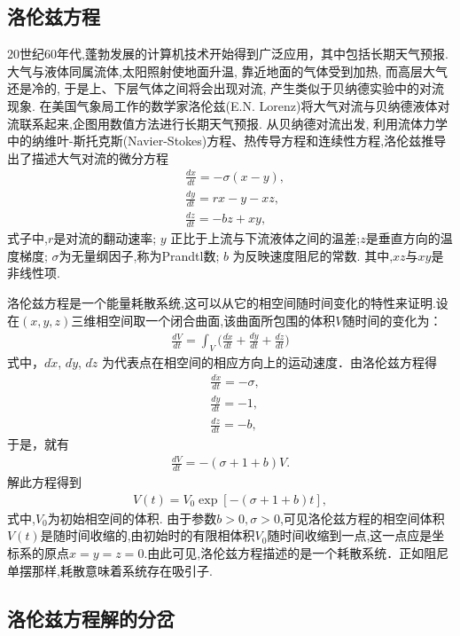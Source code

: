 \subsection{洛伦兹方程}

20世纪60年代,蓬勃发展的计算机技术开始得到广泛应用，其中包括长期天气预报. 大气与液体同属流体,太阳照射使地面升温, 靠近地面的气体受到加热, 而高层大气还是冷的, 于是上、下层气体之间将会出现对流, 产生类似于贝纳德实验中的对流现象. 在美国气象局工作的数学家洛伦兹(E.N. Lorenz)将大气对流与贝纳德液体对流联系起来,企图用数值方法进行长期天气预报. 从贝纳德对流出发, 利用流体力学中的纳维叶-斯托克斯(Navier-Stokes)方程、热传导方程和连续性方程,洛伦兹推导出了描述大气对流的微分方程
\begin{align}
&\frac{dx}{dt}=-\sigma (x-y),\\
&\frac{dy}{dt}=rx-y-xz,\\
&\frac{dz}{dt}=-bz+xy,
\end{align}
式子中,$r$是对流的翻动速率; $y$ 正比于上流与下流液体之间的温差;$z$是垂直方向的温度梯度; $\sigma$为无量纲因子,称为Prandtl数; $b$ 为反映速度阻尼的常数. 其中,$xz$与$xy$是非线性项.

洛伦兹方程是一个能量耗散系统,这可以从它的相空间随时间变化的特性来证明.设在$(x,y, z)$三维相空间取一个闭合曲面,该曲面所包围的体积$V$随时间的变化为：
\begin{align}
\frac{dV}{dt}=\int_V \Big(\frac{d\dot{x}}{dt}+\frac{d\dot{y}}{dt}+\frac{d\dot{z}}{dt}\Big)
\end{align}
式中，$d\dot{x}$, $d\dot{y}$, $d\dot{z}$ 为代表点在相空间的相应方向上的运动速度．由洛伦兹方程得
\begin{align}
&\frac{d\dot{x}}{dt}=-\sigma,\\
&\frac{d\dot{y}}{dt}=-1,\\
&\frac{d\dot{z}}{dt}=-b,
\end{align}
于是，就有
\begin{align}
\frac{dV}{dt}=-(\sigma+1+b)V.
\end{align}
解此方程得到
\begin{align}
V(t)=V_0\exp[-(\sigma+1+b)t],
\end{align}
式中,$V_0$为初始相空间的体积. 由于参数$b>0,\sigma>0$,可见洛伦兹方程的相空间体积$V(t)$是随时间收缩的,由初始时的有限相体积$V_0$随时间收缩到一点,这一点应是坐标系的原点$x=y=z=0$.由此可见,洛伦兹方程描述的是一个耗散系统．正如阻尼单摆那样,耗散意味着系统存在吸引子.

\subsection{洛伦兹方程解的分岔}

